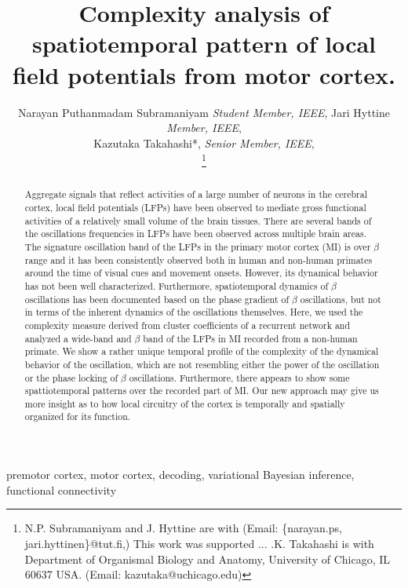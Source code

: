 \documentclass[letterpaper, 9pt, conference]{ieeeconf}
\title{\LARGE \bf
Complexity analysis of spatiotemporal pattern of local field potentials from motor cortex.
}
\author{Narayan Puthanmadam Subramaniyam {\em Student Member, IEEE}, Jari Hyttine {\em Member, IEEE}, \\
Kazutaka Takahashi*, {\em Senior Member, IEEE}, \\
\thanks{N.P. Subramaniyam and J. Hyttine are with (Email: \{narayan.ps, jari.hyttinen\}@tut.fi,) This work was supported ... .K. Takahashi is with Department of Organismal Biology and Anatomy, University of Chicago, IL 60637 USA. 
 (Email: kazutaka@uchicago.edu)}}
\begin{document}
\maketitle
\thispagestyle{empty}
\pagestyle{empty}



\begin{abstract}
Aggregate signals that reflect activities of a large number of neurons in the cerebral cortex, local field potentials (LFPs) have been observed to mediate gross functional activities of a relatively small volume of the brain tissues. There are several bands of the oscillations frequencies in LFPs have been observed across multiple brain areas. 
The signature oscillation band of the LFPs in the primary motor cortex (MI) is over $\beta$ range and it has been consistently observed both in human and non-human primates around the time of visual cues and movement onsets. 
However, its dynamical behavior has not been well characterized. Furthermore, spatiotemporal dynamics of $\beta$ oscillations has been documented based on the phase gradient of $\beta$ oscillations, but not in terms of the inherent dynamics of the oscillations themselves. Here, we used the complexity measure derived from cluster coefficients of a recurrent network and analyzed a wide-band and $\beta$ band of the LFPs in MI recorded from a non-human primate. We show a rather unique temporal profile of the complexity of the dynamical behavior of the oscillation, which are not resembling either the power of the oscillation or the phase locking of $\beta$ oscillations. Furthermore, there appears to show some spattiotemporal patterns over the recorded part of MI. Our new approach may give us more insight as to how local circuitry of the cortex is temporally and spatially organized for its function. 
\end{abstract}

\begin{keywords}
premotor cortex, motor cortex, decoding, variational Bayesian inference, functional connectivity
\end{keywords}


%
%
%
%
\end{document}
